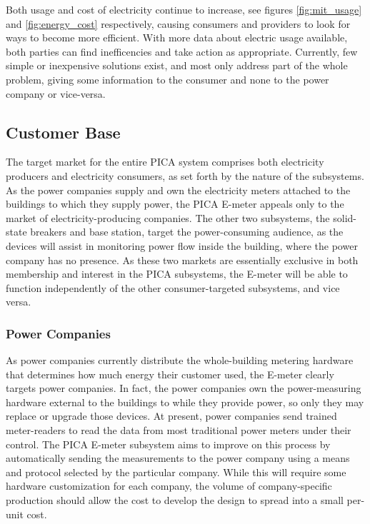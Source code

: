Both usage and cost of electricity continue to increase, see figures \ref{fig:mit_usage} and \ref{fig:energy_cost} respectively, causing consumers and providers to look for ways to become more efficient. With more data about electric usage available, both parties can find inefficencies and take action as appropriate. Currently, few simple or inexpensive solutions exist, and most only address part of the whole problem, giving some information to the consumer and none to the power company or vice-versa.

\subsection{Customer Base}
The target market for the entire PICA system comprises both electricity
producers and electricity consumers, as set forth by the nature of the
subsystems. As the power companies supply and own the electricity meters
attached to the buildings to which they supply power, the PICA E-meter appeals
only to the market of electricity-producing companies. The other two subsystems,
the solid-state breakers and base station, target the power-consuming audience,
as the devices will assist in monitoring power flow inside the building, where
the power company has no presence. As these two markets are essentially
exclusive in both membership and interest in the PICA subsystems, the E-meter
will be able to function independently of the other consumer-targeted
subsystems, and vice versa.

\subsubsection{Power Companies} %
As power companies currently distribute the whole-building metering hardware
that determines how much energy their customer used, the E-meter clearly targets
power companies. In fact, the power companies own the power-measuring hardware
external to the buildings to while they provide power, so only they may replace
or upgrade those devices. At present, power companies send trained meter-readers
to read the data from most traditional power meters under their control. The
PICA E-meter subsystem aims to improve on this process by automatically sending
the measurements to the power company using a means and protocol selected by the
particular company. While this will require some hardware customization for each
company, the volume of company-specific production should allow the cost to
develop the design to spread into a small per-unit cost. 

